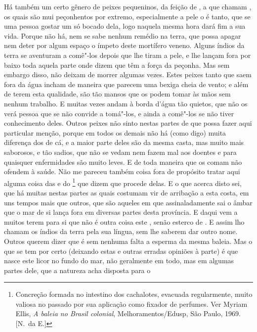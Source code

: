 Há também um certo gênero de peixes pequeninos, da feição de
, a que chamam , os quais são 
mui peçonhentos por extremo, especialmente a pele		%
o é tanto, que se uma pessoa gostar um só bocado dela, logo naquela
mesma hora dará fim a sua vida. Porque não há, nem se sabe nenhum
remédio na terra, que possa apagar nem deter por algum espaço o ímpeto
deste mortífero veneno. Alguns índios da terra se aventuram a comê"-los			%
depois que lhe tiram a pele, e lhe lançam fora por baixo toda aquela
parte onde dizem que têm a força da peçonha. Mas sem embargo disso, não
deixam de morrer algumas vezes. Estes peixes tanto que saem fora da água			%
incham de maneira que parecem uma bexiga cheia de vento; e além de terem
esta qualidade, são tão mansos que os podem tomar às mãos sem nenhum
trabalho. E muitas vezes andam à borda d'água tão
quietos, que não os verá pessoa que se não convide a tomá"-los, e ainda
a comê"-los se não tiver conhecimento deles. Outros peixes não sinto
nestas partes de que possa fazer aqui particular menção, porque em
todos os demais não há (como digo) muita diferença dos de cá, e a
maior parte deles são da mesma casta, mas muito mais saborosos, e tão sadios,
que não se vedam nem fazem mal aos doentes e para quaisquer
enfermidades são muito leves. E de toda maneira que os comam não			%
ofendem à saúde. Não me pareceu também coisa fora de propósito tratar
aqui alguma coisa das  e do \footnote{ Concreção formada no intestino
dos cachalotes, evacuada regularmente, muito valiosa no passado por sua aplicação como fixador
de perfumes. Ver Myriam Ellis, \textit{A baleia no Brasil colonial}, 
Melhoramentos/Edusp, São Paulo, 1969. [N.~da E.]} que dizem que procede delas. E o
que acerca disto sei, que há muitas nestas partes as quais costumam vir
de arribação a esta costa, em uns tempos mais que outros, que são aqueles
em que assinaladamente sai o âmbar que o mar de si lança fora em
diversas partes desta província. E daqui vem a muitos terem para si que
não é outra coisa este , senão esterco de . E assim lho
chamam os índios da terra pela sua língua, sem lhe saberem dar outro			%
nome. Outros querem dizer que é sem nenhuma falta a esperma da mesma 
baleia. Mas o que se tem por certo (deixando estas e outras erradas
opiniões à parte) é que nasce este licor no fundo do mar, não geralmente
em todo, mas em algumas partes dele, que a natureza acha disposta para o

